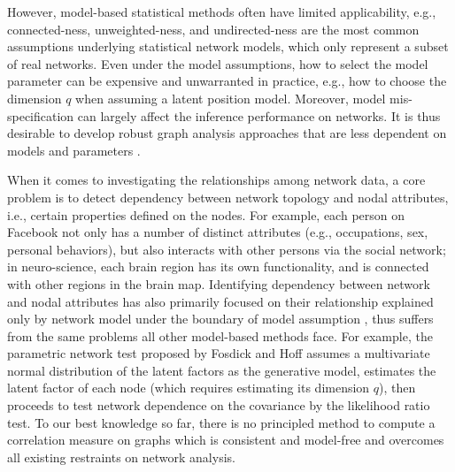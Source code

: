 \documentclass[11pt]{article}
\theoremstyle{definition}
\begin{document}
However, model-based statistical methods often have limited applicability, e.g., connected-ness, unweighted-ness, and undirected-ness are the most common assumptions underlying statistical network models, which only represent a subset of real networks. Even under the model assumptions, how to select the model parameter can be expensive and unwarranted in practice, e.g., how to choose the dimension $q$ when assuming a latent position model. Moreover, model mis-specification can largely affect the inference performance on networks. It is thus desirable to develop robust graph analysis approaches that are less dependent on models and parameters \cite{ChenShenVogelsteinPriebe2016}.

When it comes to investigating the relationships among network data, a core problem is to detect dependency between network topology and nodal attributes, i.e., certain properties defined on the nodes. For example, each person on Facebook not only has a number of distinct attributes (e.g., occupations, sex, personal behaviors), but also interacts with other persons via the social network; in neuro-science, each brain region has its own functionality, and is connected with other regions in the brain map. Identifying dependency between network and nodal attributes has also primarily focused on their relationship explained only by network model under the boundary of model assumption \cite{wasserman1996logit, fosdick2015testing, howard2016understanding}, thus suffers from the same problems all other model-based methods face. For example, the parametric network test proposed by Fosdick and Hoff \cite{fosdick2015testing} assumes a multivariate normal distribution of the latent factors as the generative model, estimates the latent factor of each node (which requires estimating its dimension $q$), then proceeds to test network dependence on the covariance by the likelihood ratio test. To our best knowledge so far, there is no principled method to compute a correlation measure on graphs which is consistent and model-free and overcomes all existing restraints on network analysis. 
\end{document}
